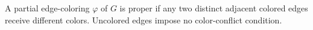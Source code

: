 \begin{definition}
A partial edge-coloring $\varphi$ of $G$ is proper if any two distinct
adjacent colored edges receive different colors.  Uncolored edges impose no
color-conflict condition.
\end{definition}
